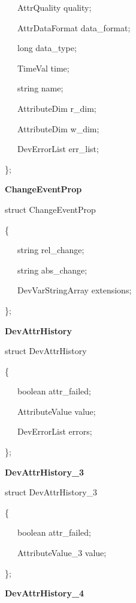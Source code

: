 ~~~AttrQuality quality;

~~~AttrDataFormat data\_format;

~~~long data\_type;

~~~TimeVal time;

~~~string name;

~~~AttributeDim r\_dim;

~~~AttributeDim w\_dim;

~~~DevErrorList err\_list;

\};\\

\begin{flushleft}
\textbf{ChangeEventProp}
\par\end{flushleft}

struct ChangeEventProp

\{

~~~string rel\_change;

~~~string abs\_change;

~~~DevVarStringArray extensions;

\};\\

\begin{flushleft}
\textbf{DevAttrHistory}
\par\end{flushleft}

struct DevAttrHistory

\{

~~~boolean attr\_failed;

~~~AttributeValue value;

~~~DevErrorList errors;

\};\\

\begin{flushleft}
\textbf{DevAttrHistory\_3}
\par\end{flushleft}

struct DevAttrHistory\_3

\{

~~~boolean attr\_failed;

~~~AttributeValue\_3 value;

\};\\

\begin{flushleft}
\textbf{DevAttrHistory\_4}
\par\end{flushleft}


